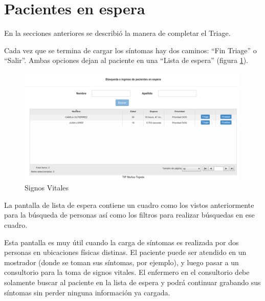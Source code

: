 \section{Pacientes en espera}
En la secciones anteriores se describió la manera de completar el Triage. 

Cada vez que se termina de cargar los síntomas hay dos caminos: ``Fin Triage'' o ``Salir''. Ambas opciones dejan al paciente en una ``Lista de espera'' (figura \ref{fig:espera}).
\begin{figure}
\centerline{\includegraphics[width=0.99\textwidth]{espera.png}}
\caption{Signos Vitales} \label{fig:espera}
\end{figure}
 La pantalla de lista de espera contiene un cuadro como los vistos anteriormente para la búsqueda de personas así como los filtros para realizar búsquedas en ese cuadro.

Esta pantalla es muy útil cuando la carga de síntomas es realizada por dos personas en ubicaciones físicas distinas. El paciente puede ser atendido en un mostrador (donde se toman sus síntomas, por ejemplo), y luego pasar a un consultorio para la toma de signos vitales. El enfermero en el consultorio debe solamente buscar al paciente en la lista de espera y podrá continuar grabando sus síntomas sin perder ninguna información ya cargada.

